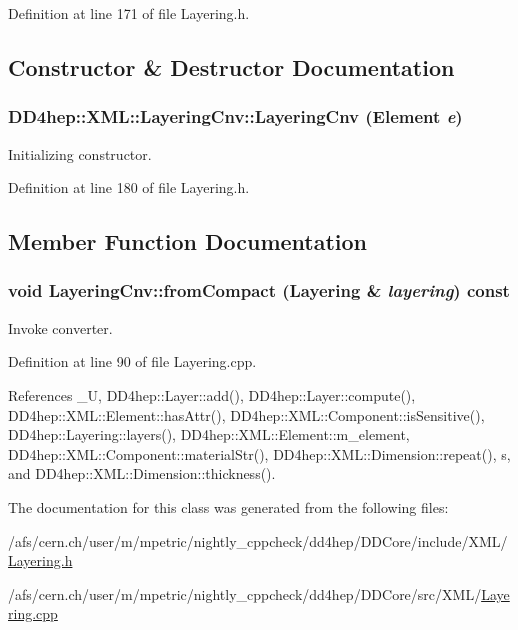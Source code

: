 Definition at line 171 of file Layering.h.

\subsection{Constructor \& Destructor Documentation}
\hypertarget{class_d_d4hep_1_1_x_m_l_1_1_layering_cnv_ab6b99c78432dbaf778778eb47163eda7}{
\subsubsection[{LayeringCnv}]{\setlength{\rightskip}{0pt plus 5cm}DD4hep::XML::LayeringCnv::LayeringCnv ({\bf Element} {\em e})}}
\label{class_d_d4hep_1_1_x_m_l_1_1_layering_cnv_ab6b99c78432dbaf778778eb47163eda7}


Initializing constructor. 

Definition at line 180 of file Layering.h.

\subsection{Member Function Documentation}
\hypertarget{class_d_d4hep_1_1_x_m_l_1_1_layering_cnv_a458cb449e483e9a5a7a146047f4a3ac5}{
\subsubsection[{fromCompact}]{\setlength{\rightskip}{0pt plus 5cm}void LayeringCnv::fromCompact ({\bf Layering} \& {\em layering}) const}}
\label{class_d_d4hep_1_1_x_m_l_1_1_layering_cnv_a458cb449e483e9a5a7a146047f4a3ac5}


Invoke converter. 

Definition at line 90 of file Layering.cpp.

References \_\-U, DD4hep::Layer::add(), DD4hep::Layer::compute(), DD4hep::XML::Element::hasAttr(), DD4hep::XML::Component::isSensitive(), DD4hep::Layering::layers(), DD4hep::XML::Element::m\_\-element, DD4hep::XML::Component::materialStr(), DD4hep::XML::Dimension::repeat(), s, and DD4hep::XML::Dimension::thickness().

The documentation for this class was generated from the following files:\begin{DoxyCompactItemize}
\item 
/afs/cern.ch/user/m/mpetric/nightly\_\-cppcheck/dd4hep/DDCore/include/XML/\hyperlink{_layering_8h}{Layering.h}\item 
/afs/cern.ch/user/m/mpetric/nightly\_\-cppcheck/dd4hep/DDCore/src/XML/\hyperlink{_layering_8cpp}{Layering.cpp}\end{DoxyCompactItemize}

